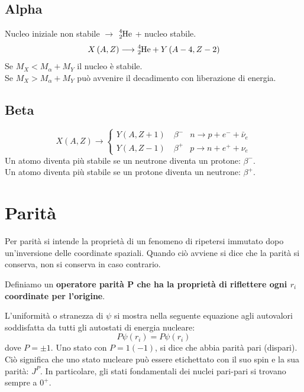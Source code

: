 \documentclass[a4paper,11pt,twoside,openany]{book}
\theoremstyle{definition}
\theoremstyle{plain}
\theoremstyle{plain}
\theoremstyle{definition}
\begin{document}
\subsection{Alpha} %
Nucleo iniziale non stabile $\longrightarrow$ $\ce{^4_2He}$ + nucleo stabile.
\begin{equation}\begin{split}
X\left(A,Z\right) \longrightarrow \ce{^4_2He}+Y\left(A-4,Z-2\right)
\end{split}\end{equation}
Se $M_X<M_{\alpha}+M_Y$ il nucleo è stabile.\\
Se $M_X>M_{\alpha}+M_Y$ può avvenire il decadimento con liberazione di energia.

\subsection{Beta} %
\begin{equation}
X\left(A,Z\right) \longrightarrow 
\begin{cases}
Y\left(A,Z+1\right) \quad \beta^- & n\longrightarrow p+e^-+\bar\nu_e \\
Y\left(A,Z-1\right) \quad \beta^+ & p\longrightarrow n+e^++\nu_e
\end{cases}
\end{equation}
Un atomo diventa più stabile se un neutrone diventa un protone: \textbf{$\beta^-$}.\\
Un atomo diventa più stabile se un protone diventa un neutrone: \textbf{$\beta^+$}.

\section{Parità} %
Per parità si intende la proprietà di un fenomeno di ripetersi immutato dopo un'inversione delle coordinate spaziali. Quando ciò avviene si dice che la parità si conserva, non si conserva in caso contrario.

Definiamo un \textbf{operatore parità P che ha la proprietà di riflettere ogni $r_i$ coordinate per l'origine}.

L'uniformità o stranezza di $\psi$ si mostra nella seguente equazione agli autovalori soddisfatta da tutti gli autostati di energia nucleare: $$P\psi(r_i)=P\psi(r_i)$$ dove $P=\pm 1$. Uno stato con $P = 1 (-1)$, si dice che abbia parità pari (dispari). Ciò significa che uno stato nucleare può essere etichettato con il suo spin e la sua parità: $J^P$. In particolare, gli stati fondamentali dei nuclei pari-pari si trovano sempre a $0^+$.
\end{document}
